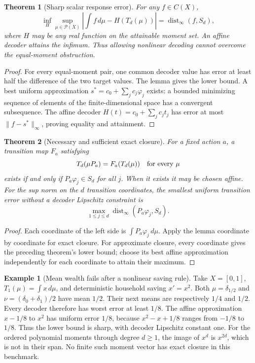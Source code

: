 \documentclass[11pt]{article}
\newtheorem{theorem}{Theorem}
\theoremstyle{definition}
\newtheorem{example}{Example}
\begin{document}
\begin{theorem}[Sharp scalar response error]
For any $f\in C(X)$,
\[
 \inf_{H}\sup_{\mu\in\mathcal P(X)}
 \left|\int f\,d\mu-H(T_d(\mu))\right|
 =\operatorname{dist}_\infty(f,S_d),
\]
where $H$ may be any real function on the attainable moment set. An affine decoder attains the infimum. Thus allowing nonlinear decoding cannot overcome the equal-moment obstruction.
\end{theorem}
\begin{proof}
For every equal-moment pair, one common decoder value has error at least half the difference of the two target values. The lemma gives the lower bound. A best uniform approximation $s^*=c_0+\sum_jc_j\varphi_j$ exists: a bounded minimizing sequence of elements of the finite-dimensional space has a convergent subsequence. The affine decoder $H(t)=c_0+\sum_jc_jt_j$ has error at most $\|f-s^*\|_\infty$, proving equality and attainment.
\end{proof}

\begin{theorem}[Necessary and sufficient exact closure]
For a fixed action $a$, a transition map $F_a$ satisfying
\[
 T_d(\mu P_a)=F_a(T_d(\mu))\quad\hbox{for every }\mu
\]
exists if and only if $P_a\varphi_j\in S_d$ for all $j$. When it exists it may be chosen affine. For the sup norm on the $d$ transition coordinates, the smallest uniform transition error without a decoder Lipschitz constraint is
\[
 \max_{1\leq j\leq d}\operatorname{dist}_\infty(P_a\varphi_j,S_d).
\]
\end{theorem}
\begin{proof}
Each coordinate of the left side is $\int P_a\varphi_j\,d\mu$. Apply the lemma coordinate by coordinate for exact closure. For approximate closure, every coordinate gives the preceding theorem's lower bound; choose its best affine approximation independently for each coordinate to attain their maximum.
\end{proof}

\begin{example}[Mean wealth fails after a nonlinear saving rule]
Take $X=[0,1]$, $T_1(\mu)=\int x\,d\mu$, and deterministic household saving $x'=x^2$. Both $\mu=\delta_{1/2}$ and $\nu=(\delta_0+\delta_1)/2$ have mean $1/2$. Their next means are respectively $1/4$ and $1/2$. Every decoder therefore has worst error at least $1/8$. The affine approximation $x-1/8$ to $x^2$ has uniform error $1/8$, because $x^2-x+1/8$ ranges from $-1/8$ to $1/8$. Thus the lower bound is sharp, with decoder Lipschitz constant one. For the ordered polynomial moments through degree $d\geq1$, the image of $x^d$ is $x^{2d}$, which is not in their span. No finite such moment vector has exact closure in this benchmark.
\end{example}
\end{document}
